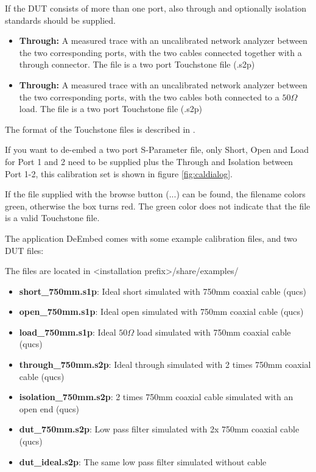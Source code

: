 If the DUT consists of more than one port, also through and optionally isolation standards should be supplied. 
\begin{itemize}
	\item {\textbf{Through:} A measured trace with an uncalibrated network analyzer between the two corresponding ports, with the two cables connected together with a through connector. The file is a two port Touchstone file (.s2p)}
	\item {\textbf{Through:} A measured trace with an uncalibrated network analyzer between the two corresponding ports, with the two cables both connected to a $50\Omega$ load. The file is a two port Touchstone file (.s2p)}
\end{itemize}
The format of the Touchstone files is described in \cite{touchstoneformat}.

If you want to de-embed a two port S-Parameter file, only Short, Open and Load for Port 1 and 2 need to be supplied plus the Through and Isolation between Port 1-2, this calibration set is shown in figure \ref{fig:caldialog}.

If the file supplied with the browse button (...) can be found, the filename colors green, otherwise the box turns red. The green color does not indicate that the file is a valid Touchstone file.

The application DeEmbed comes with some example calibration files, and two DUT files:

The files are located in <installation prefix>/share/examples/ 
\begin{itemize}
\item \textbf{short\_750mm.s1p}: Ideal short simulated with 750mm coaxial cable (qucs)
\item \textbf{open\_750mm.s1p}: Ideal open simulated with 750mm coaxial cable (qucs)
\item \textbf{load\_750mm.s1p}: Ideal $50\Omega$ load simulated with 750mm coaxial cable (qucs)
\item \textbf{through\_750mm.s2p}: Ideal through simulated with 2 times 750mm coaxial cable (qucs)
\item \textbf{isolation\_750mm.s2p}: 2 times 750mm coaxial cable simulated with an open end (qucs)
\item \textbf{dut\_750mm.s2p}: Low pass filter simulated with 2x 750mm coaxial cable (qucs)
\item \textbf{dut\_ideal.s2p}: The same low pass filter simulated without cable

\end{itemize}

